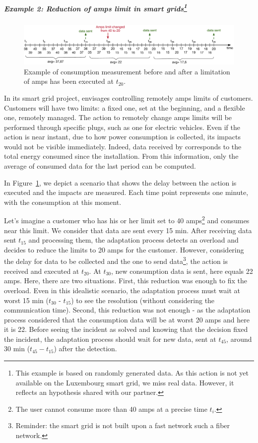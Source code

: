 \subparagraph[Example 2: Reduction of amps limits in smart grids]{Example 2: Reduction of amps limit in smart grids\footnote{This example is based on randomly generated data. As this action is not yet available on the Luxembourg smart grid, we miss real data. However, it reflects an hypothesis shared with our partner.}}
\begin{figure}
	\centering
	\includegraphics[width=\linewidth]{img/chapt-tkm/intro/long-action-amps-limit}
	\caption{Example of consumption measurement before and after a limitation of amps has been executed at $t_{20}$.}
	\label{fig:tkm:intro:example-long-action-amps-limit}
\end{figure}

In its smart grid project, \creos envisages controlling remotely amps limits of customers.
Customers will have two limits: a fixed one, set at the beginning, and a flexible one, remotely managed.
The action to remotely change amps limits will be performed through specific plugs, such as one for electric vehicles.
Even if the action is near instant, due to how power consumption is collected, its impacts would not be visible immediately.
Indeed, data received by \creos corresponds to the total energy consumed since the installation.
From this information, only the average of consumed data for the last period can be computed.

In Figure~\ref{fig:tkm:intro:example-long-action-amps-limit}, we depict a scenario that shows the delay between the action is executed and the impacts are measured.
Each time point represents one minute, with the consumption at this moment.

Let's imagine a customer who has his or her limit set to 40 amps\footnote{The user cannot consume more than 40 amps at a precise time $t_i$.} and consumes near this limit.
We consider that data are sent every 15 min.
After receiving data sent $t_{15}$ and processing them, the adaptation process detects an overload and decides to reduce the limits to 20 amps for the customer.
However, considering the delay for data to be collected and the one to send data\footnote{Reminder: the smart grid is not built upon a fast network such a fiber network.}, the action is received and executed at $t_{20}$.
At $t_{30}$, new consumption data is sent, here equals 22 amps.
Here, there are two situations.
First, this reduction was enough to fix the overload.
Even in this idealistic scenario, the adaptation process must wait at worst 15 min ($t_{30}$ - $t_{15}$) to see the resolution (without considering the communication time).
Second, this reduction was not enough - as the adaptation process considered that the consumption data will be at worst 20 amps and here it is 22.
Before seeing the incident as solved and knowing that the decision fixed the incident, the adaptation process should wait for new data, sent at $t_{45}$, \ie around 30 min ($t_{45} - t_{15}$) after the detection.

